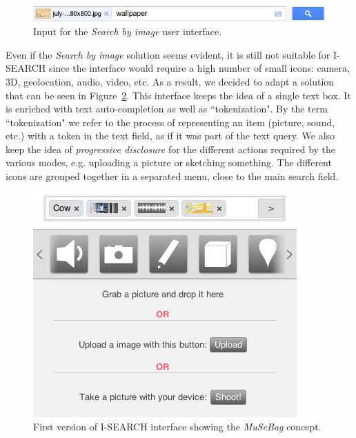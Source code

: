 \documentclass[runningheads,a4paper]{llncs} \usepackage[utf8]{inputenc}
\begin{document}
\begin{figure}[h!]
  \centering
    \includegraphics[width=0.6\linewidth]{resources/search-by-image-UI-box.png}
  \caption{Input for the \textit{Search by image} user interface.}
  \label{fig:search-by-image-box}
\end{figure}

Even if the \textit{Search by image} solution seems evident, it is still not suitable for \mbox{I-SEARCH} since the interface would require a high number of small icons: camera, 3D, geolocation, audio, video, etc.  As a result, we decided to adapt a solution that can be seen in Figure~\ref{fig:isearch-ui}. This interface keeps the idea of a single text box. It is enriched with text auto-completion as well as ``tokenization". By the term ``tokenization" we refer to the process of representing an item (picture, sound, etc.) with a token in the text field, as if it was part of the text query. We also keep the idea of \emph{progressive disclosure} for the different actions required by the various modes, e.g. uploading a picture or sketching something. The different icons are grouped together in a separated menu, close to the main search field.

\begin{figure}[h!]
  \centering
    \includegraphics[width=0.4\linewidth]{resources/isearch-UI-mobile.png}
  \caption{First version of \mbox{I-SEARCH} interface showing the \emph{MuSeBag} concept.}
  \label{fig:isearch-ui}
\end{figure}
\end{document}
